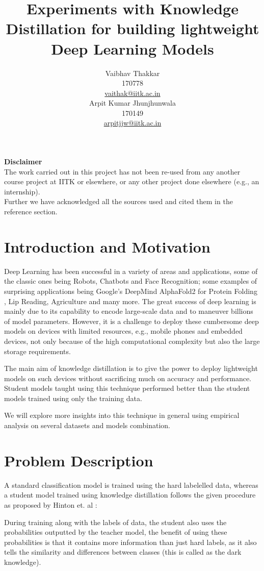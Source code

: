 \documentclass{article} %
\title{Experiments with Knowledge Distillation for building lightweight Deep Learning Models}
\author{
	Vaibhav Thakkar \\
	170778 \\
	\href{vaithak@iitk.ac.in}{vaithak@iitk.ac.in}\\
	\And
	Arpit Kumar Jhunjhunwala \\
	170149 \\
	\href{mailto:arpitjjw@iitk.ac.in}{arpitjjw@iitk.ac.in} 
}
\begin{document}
	
	
	\maketitle
	\begin{center}
		\textbf{Disclaimer}\\
		The work carried out in this project has not been re-used from any another course project at IITK or elsewhere, or any other project done elsewhere (e.g., an internship).\\
		Further we have acknowledged all the sources used and cited them in the reference section.
		
	\end{center}
	\section{Introduction and Motivation}
	Deep Learning has been successful in a variety of areas and applications, some of the classic ones being Robots, Chatbots and Face Recognition; some examples of surprising applications being Google's DeepMind AlphaFold2 for Protein Folding \cite{alphafold},  Lip Reading, Agriculture \cite{Kamilaris_2018} and many more. The great success of deep learning is mainly due to its capability to encode large-scale data and to maneuver billions of model parameters. However, it is a challenge to deploy these cumbersome deep models on devices with limited resources, e.g., mobile phones and embedded devices, not only because of the high computational complexity but also the large storage requirements. 
	
	The main aim of knowledge distillation is to give the power to deploy lightweight models on such devices without sacrificing much on accuracy and performance. Student models taught using this technique performed better than the student models trained using only the training data. 
	
	We will explore more insights into this technique in general using empirical analysis on several datasets and models combination.
	\section{Problem Description}
	A standard classification model is trained using the hard labelelled data, whereas a student model trained using knowledge distillation follows the given procedure as proposed by Hinton et. al \cite{hinton2015distilling}:
	
	During training along with the labels of data, the student also uses the probabilities outputted by the teacher model, the benefit of using these probabilities is that it contains more information than just hard labels, as it also tells the similarity and differences between classes (this is called as the dark knowledge).
	\newpage
	
\end{document}
